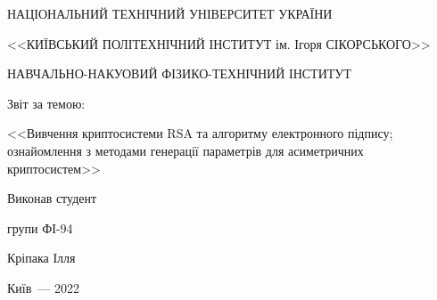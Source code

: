 
	\thispagestyle{empty}
	
	\begin{center}
		НАЦІОНАЛЬНИЙ ТЕХНІЧНИЙ УНІВЕРСИТЕТ УКРАЇНИ \par
		<<КИЇВСЬКИЙ ПОЛІТЕХНІЧНИЙ ІНСТИТУТ ім. Ігоря СІКОРСЬКОГО>>\par
		НАВЧАЛЬНО-НАКУОВИЙ ФІЗИКО-ТЕХНІЧНИЙ ІНСТИТУТ\par
		
		\vspace{60mm}
		{\huge Звіт за темою:\par
			\LARGE <<Вивчення криптосистеми RSA та алгоритму електронного
підпису; ознайомлення з методами генерації параметрів для
асиметричних криптосистем>>\par}
		
	\end{center}
	
	\vspace{40mm}
	\begin{flushright}
		Виконав студент
		
		групи ФІ-94
		
		Кріпака Ілля
		
	\end{flushright}
	
	\vspace{33mm}
	\begin{center}
		{Київ~--- 2022}
	\end{center}
	